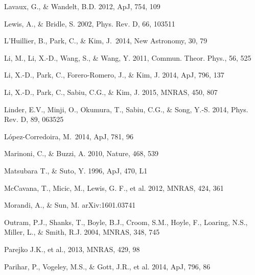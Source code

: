\documentclass[iop]{emulateapj}
\begin{document}
\begin{thebibliography}{}
Lavaux, G., \& Wandelt, B.D. 2012, ApJ, 754, 109  


Lewis, A., \& Bridle, S. 2002, Phys. Rev. D, 66, 103511

L'Huillier, B., Park, C., \& Kim, J.\ 2014, New Astronomy, 30, 79 

Li, M., Li, X.-D., Wang, S., \& Wang, Y. 2011, Commun. Theor. Phys., 56, 525

Li, X.-D., Park, C., Forero-Romero, J., \& Kim, J. 2014, ApJ, 796, 137

Li, X.-D., Park, C., Sabiu, C.G., \& Kim, J. 2015, MNRAS, 450, 807 


Linder, E.V., Minji, O., Okumura, T., Sabiu, C.G., \& Song, Y.-S. 2014, Phys. Rev. D, 89, 063525  

L{\'o}pez-Corredoira, M.\ 2014, ApJ, 781, 96 

Marinoni, C., \& Buzzi, A. 2010, Nature, 468, 539  

Matsubara T., \& Suto, Y. 1996, ApJ, 470, L1  

McCavana, T., Micic, M., Lewis, G. F., et al. 2012, MNRAS, 424, 361


Morandi, A., \& Sun, M. arXiv:1601.03741


Outram, P.J., Shanks, T., Boyle, B.J., Croom, S.M., Hoyle, F., Loaring, N.S., 
Miller, L., \& Smith, R.J. 2004, MNRAS, 348, 745  


Parejko J.K., et al., 2013, MNRAS, 429, 98

Parihar, P., Vogeley, M.S., \& Gott, J.R., et al. 2014, ApJ, 796, 86


\end{thebibliography}
\end{document}
